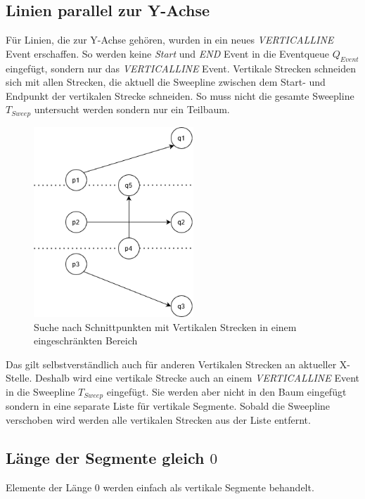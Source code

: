 \documentclass[conference]{IEEEtran}
\begin{document}
	\subsection{Linien parallel zur Y-Achse}
	Für Linien, die zur Y-Achse gehören, wurden in ein neues \textit{VERTICALLINE} Event erschaffen. So werden keine \textit{Start} und \textit{END} Event in die Eventqueue $Q_{Event}$ eingefügt, sondern nur das \textit{VERTICALLINE} Event.
	Vertikale Strecken schneiden sich mit allen Strecken, die aktuell die Sweepline zwischen dem Start- und Endpunkt der vertikalen Strecke schneiden. So muss nicht die gesamte Sweepline $T_{Sweep}$ untersucht werden sondern nur ein Teilbaum.
	\begin{figure}[h]
		\begin{center}
			\includegraphics[width=6cm]{Vertikal.png}
			\caption{Suche nach Schnittpunkten mit Vertikalen Strecken in einem eingeschränkten Bereich}
			\label{figure_3}
		\end{center}
	\end{figure}
	Das gilt selbstverständlich auch für anderen Vertikalen Strecken an aktueller X-Stelle. Deshalb wird eine vertikale Strecke auch an einem \textit{VERTICALLINE} Event in die Sweepline $T_{Sweep}$ eingefügt. Sie werden aber nicht in den Baum eingefügt sondern in eine separate Liste für vertikale Segmente. Sobald die Sweepline verschoben wird werden alle vertikalen Strecken aus der Liste entfernt.
		
	\subsection{Länge der Segmente gleich $0$}
	Elemente der Länge 0 werden einfach als vertikale Segmente behandelt.
	
\end{document}
